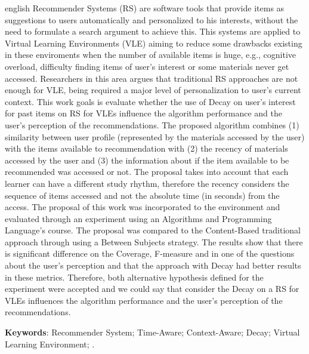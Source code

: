 \begin{resumo}[Abstract]
 \begin{otherlanguage*}{english}
  	Recommender Systems (RS) are software tools that provide items as suggestions to users automatically and personalized to his
    interests, without the need to formulate a search argument to achieve this. This systems are applied to Virtual Learning
    Environments (VLE) aiming to reduce some drawbacks existing in these enviroments when the number of available items is
    huge, e.g., cognitive overload, difficulty finding items of user's interest or some materials never get accessed. Researchers
    in this area argues that traditional RS approaches are not enough for VLE, being required a major level of personalization
    to user's current context. This work goals is evaluate whether the use of Decay on user's interest for past items
    on RS for VLEs influence the algorithm performance and the user's perception of the recommendations. The proposed
    algorithm combines (1) similarity between user profile (represented by the materials accessed by the user) with the items
    available to recommendation with (2) the recency of materials accessed by the user and (3) the information about if
    the item available to be recommended was accessed or not. The proposal takes into account that each learner can have
    a different study rhythm, therefore the recency considers the sequence of items accessed and not the absolute time (in
    seconds) from the access. The proposal of this work was incorporated to the \adaptwebspace environment and evaluated
    through an experiment using an Algorithms and Programming Language's course. The proposal was compared to the Content-Based traditional approach
    through using a Between Subjects strategy. The results show that there is significant difference on the Coverage,
    F-measure and in one of the questions about the user's perception and that the approach with Decay had better results
    in these metrics. Therefore, both alternative hypothesis defined for the experiment were accepted and we could say
    that consider the Decay on a RS for VLEs influences the algorithm performance and the user's perception of the recommendations.
    \vspace{\onelineskip}

    \noindent
    \textbf{Keywords}: Recommender System; Time-Aware; Context-Aware; Decay; Virtual Learning Environment; \adaptweb.
 \end{otherlanguage*}
\end{resumo}

\listoffigures*
\cleardoublepage

\listoftables*
\cleardoublepage